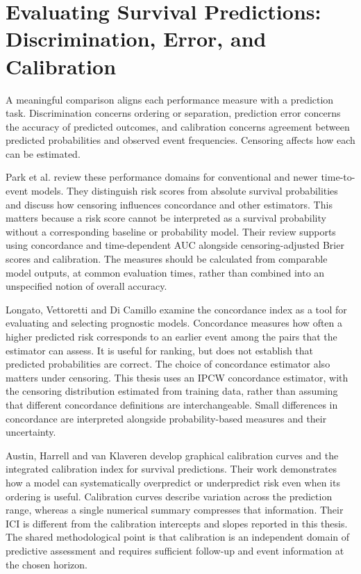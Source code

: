 \section{Evaluating Survival Predictions: Discrimination, Error, and Calibration}\label{evaluating-survival-predictions-discrimination-error-and-calibration}

A meaningful comparison aligns each performance measure with a prediction task. Discrimination concerns ordering or separation, prediction error concerns the accuracy of predicted outcomes, and calibration concerns agreement between predicted probabilities and observed event frequencies. Censoring affects how each can be estimated.

Park et al. \cite{ref26} review these performance domains for conventional and newer time-to-event models. They distinguish risk scores from absolute survival probabilities and discuss how censoring influences concordance and other estimators. This matters because a risk score cannot be interpreted as a survival probability without a corresponding baseline or probability model. Their review supports using concordance and time-dependent AUC alongside censoring-adjusted Brier scores and calibration. The measures should be calculated from comparable model outputs, at common evaluation times, rather than combined into an unspecified notion of overall accuracy.

Longato, Vettoretti and Di Camillo \cite{ref27} examine the concordance index as a tool for evaluating and selecting prognostic models. Concordance measures how often a higher predicted risk corresponds to an earlier event among the pairs that the estimator can assess. It is useful for ranking, but does not establish that predicted probabilities are correct. The choice of concordance estimator also matters under censoring. This thesis uses an IPCW concordance estimator, with the censoring distribution estimated from training data, rather than assuming that different concordance definitions are interchangeable. Small differences in concordance are interpreted alongside probability-based measures and their uncertainty.

Austin, Harrell and van Klaveren \cite{ref59} develop graphical calibration curves and the integrated calibration index for survival predictions. Their work demonstrates how a model can systematically overpredict or underpredict risk even when its ordering is useful. Calibration curves describe variation across the prediction range, whereas a single numerical summary compresses that information. Their ICI is different from the calibration intercepts and slopes reported in this thesis. The shared methodological point is that calibration is an independent domain of predictive assessment and requires sufficient follow-up and event information at the chosen horizon.

